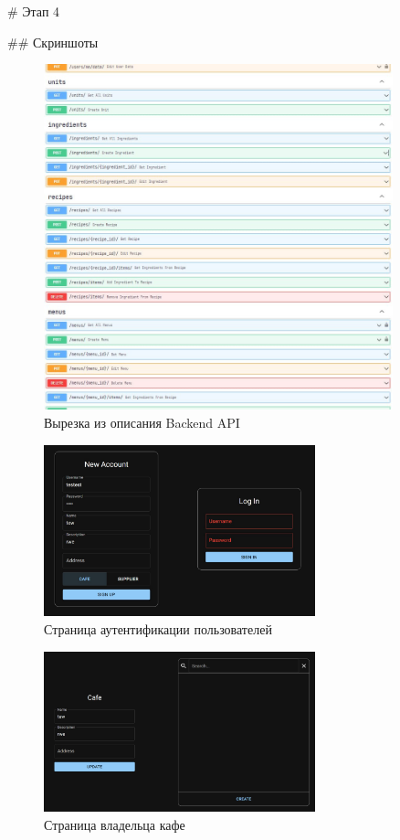 \begin{markdown}
# Этап 4

## Скриншоты
\end{markdown}

\begin{figure}[H]
  \centering
  \includegraphics[width=0.9\textwidth]{fig/swagger.jpg}
  \caption{Вырезка из описания Backend API}
\end{figure}

\begin{figure}[H]
  \centering
  \includegraphics[width=0.7\textwidth]{fig/project-1.jpg}
  \caption{Страница аутентификации пользователей}
\end{figure}

\begin{figure}[H]
  \centering
  \includegraphics[width=0.7\textwidth]{fig/project-2.jpg}
  \caption{Страница владельца кафе}
\end{figure}

